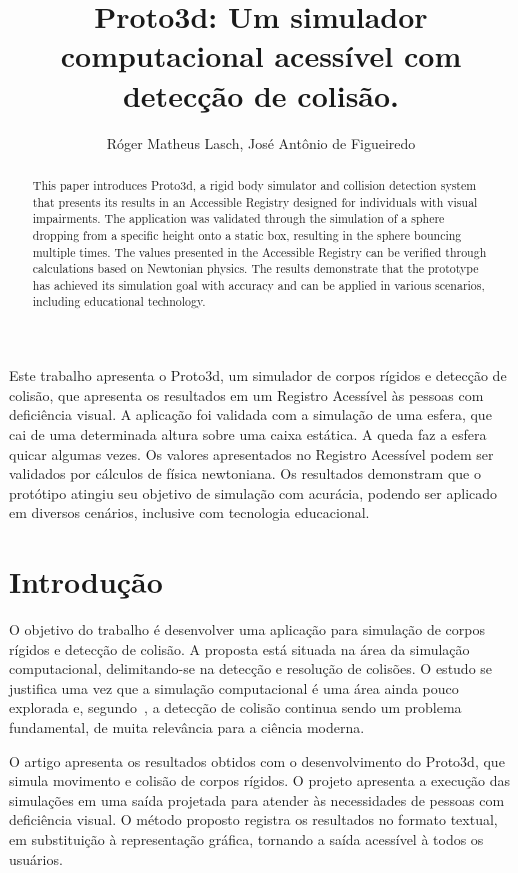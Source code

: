 \documentclass[12pt]{article}
\title{Proto3d: Um simulador computacional acessível com detecção de colisão.}
\author{Róger Matheus Lasch\inst{1}, José Antônio de Figueiredo\inst{1}}
\begin{document}
 

\maketitle

\begin{abstract}
This paper introduces Proto3d, a rigid body simulator and collision detection system that presents its results in an Accessible Registry designed for individuals with visual impairments. The application was validated through the simulation of a sphere dropping from a specific height onto a static box, resulting in the sphere bouncing multiple times. The values presented in the Accessible Registry can be verified through calculations based on Newtonian physics. The results demonstrate that the prototype has achieved its simulation goal with accuracy and can be applied in various scenarios, including educational technology.
\end{abstract}
     
\begin{resumo} 
Este trabalho apresenta o Proto3d, um simulador de corpos rígidos e detecção de colisão, que apresenta os resultados em um Registro Acessível às pessoas com deficiência visual. A aplicação foi validada com a simulação de uma esfera, que cai de uma determinada altura sobre uma caixa estática. A queda faz a esfera quicar algumas vezes. Os valores apresentados no Registro Acessível podem ser validados por cálculos de física newtoniana. Os resultados demonstram que o protótipo atingiu seu objetivo de simulação com acurácia, podendo ser aplicado em diversos cenários, inclusive com tecnologia educacional.
\end{resumo}

\section{Introdução}
O objetivo do trabalho é desenvolver uma aplicação para simulação de corpos rígidos e detecção de colisão. A proposta está situada na área da simulação computacional, delimitando-se na detecção e resolução de colisões. O estudo se justifica uma vez que a simulação computacional é uma área ainda pouco explorada e, segundo~\cite{ericson2004real}, a detecção de colisão continua sendo um problema fundamental, de muita relevância para a ciência moderna.

O artigo apresenta os resultados obtidos com o desenvolvimento do Proto3d, que simula movimento e colisão de corpos rígidos. O projeto apresenta a execução das simulações em uma saída projetada para atender às necessidades de pessoas com deficiência visual. O método proposto registra os resultados no formato textual, em substituição à representação gráfica, tornando a saída acessível à todos os usuários.
\end{document}
